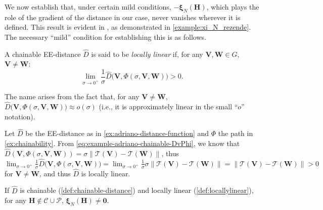 We now establish that, under certain mild conditions, $-\boldsymbol{\xi}_N(\mathbf{H})$, which plays the role of the gradient of the distance in our case, never vanishes wherever it is defined. This result is evident in \citet{Rezende2022}, as demonstrated in \cref{example:xi_N_rezende}. The necessary ``mild'' condition for establishing this is as follows.

\begin{definition}  \label{def:locallylinear}
    A chainable EE-distance $\widehat{D}$ is said to be \emph{locally linear} if, for any $\mathbf{V}, \mathbf{W} \in G$, $\mathbf{V} \not = \mathbf{W}$:
    \begin{equation}
        \lim_{\sigma \rightarrow 0^+} \frac{1}{\sigma} \widehat{D}\bigl(\mathbf{V},\Phi(\sigma,\mathbf{V},\mathbf{W})\bigr) > 0.
    \end{equation}
\end{definition}
The name arises from the fact that, for any $\mathbf{V} \not= \mathbf{W}$, $\widehat{D}\bigl(\mathbf{V},\Phi(\sigma,\mathbf{V},\mathbf{W})\bigr) \approx o(\sigma)$ (i.e., it is approximately linear in the small ``$o$'' notation).

\begin{example}
    Let $\widehat{D}$ be the EE-distance as in \cref{ex:adriano-distance-function} and $\Phi$ the path in \cref{ex:chainability}. From \eqref{eq:example-adriano-chainable-DvPhi}, we know that $\widehat{D}(\mathbf{V}, \Phi(\sigma, \mathbf{V}, \mathbf{W})) = \sigma\|\mathcal{T}(\mathbf{V}) - \mathcal{T}(\mathbf{W})\|$, thus $\lim_{\sigma \to 0^+} \frac{1}{\sigma} \widehat{D}\bigl(\mathbf{V},\Phi(\sigma,\mathbf{V},\mathbf{W})\bigr) = \lim_{\sigma \to 0^+} \frac{1}{\sigma}\sigma\|\mathcal{T}(\mathbf{V}) - \mathcal{T}(\mathbf{W})\| = \|\mathcal{T}(\mathbf{V}) - \mathcal{T}(\mathbf{W})\| > 0$ for $\mathbf{V} \not= \mathbf{W}$, and thus $\widehat{D}$ is locally linear.
    
\end{example}

\begin{lemma} \label{lemma:no-zero-xiN} If $\widehat{D}$ is chainable (\cref{def:chainable-distance}) and locally linear (\cref{def:locallylinear}), for any $\mathbf{H} \notin \mathcal{C} \cup \mathcal{P}$, $\boldsymbol{\xi}_N(\mathbf{H}) \not= \mathbf{0}$.
\end{lemma}

